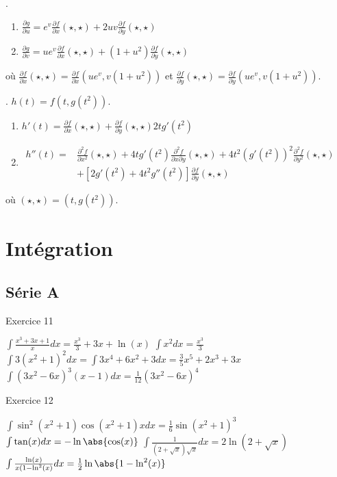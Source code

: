 .
\begin{enumerate}
    \item $\frac{ \partial g }{ \partial u } = e^v\frac{ \partial f }{ \partial x }(\star,\star)+2uv\frac{ \partial f }{ \partial y }(\star,\star)$
    \item $\frac{ \partial g }{ \partial v } = ue^v\frac{ \partial f }{ \partial x }(\star,\star)+(1+u^2)\frac{ \partial f }{ \partial y }(\star,\star)$
\end{enumerate}
o\`{u} $\frac{ \partial f }{ \partial x }(\star,\star) = \frac{ \partial f }{ \partial x }(ue^v,v(1+u^2))$ et $\frac{ \partial f }{ \partial y }(\star,\star) = \frac{ \partial f }{ \partial y }(ue^v,v(1+u^2))$.

. $h(t)=f(t,g(t^2))$.\\

\begin{enumerate}
    \item $h'(t)=\frac{ \partial f }{ \partial x }(\star,\star)+\frac{ \partial f }{ \partial y }(\star,\star)2tg'(t^2)$
    \item $ \begin{array}{rl} h''(t)=     &   \frac{ \partial^2f }{ \partial x^2 }(\star,\star)+4tg'(t^2)\frac{ \partial^2f }{ \partial x\partial y }(\star,\star)+4t^2(g'(t^2))^2\frac{ \partial^2f }{ \partial y^2 }(\star,\star) \\
        & +[2g'(t^2)+4t^2g''(t^2)]\frac{ \partial f }{ \partial y }(\star,\star)\end{array}$

\end{enumerate}
où $(\star,\star) = (t,g(t^2))$.




 \section{Intégration}
 \subsection{Série A}
 Exercice 11
 \begin{enumerate}
   \exr $\int \frac{x^3+3x+1}{x} d x = \frac{x^3}3 + 3x + \ln(x)$%
   \exr $\int x^2d x = \frac{x^3}3$%
   \exr $\int 3(x^2+1)^2 d x = \int 3 x^4 + 6 x^2 + 3 d x = \frac 35
   x^5 + 2 x^3 + 3x$%
   \exr $\int (3x^2 - 6x)^3 (x-1) d x = \frac1{12} (3x^2 - 6x)^4$
 \end{enumerate}

 Exercice 12
 \begin{enumerate}
   \exr $\int \sin^2(x^2+1) \cos(x^2+1) x d x = \frac16
   \sin(x^2+1)^3$%
   \exr $\int \tan(x) d x = -\ln\abs{\cos(x)}$%
   \exr $\int \frac{1}{(2+\sqrt{x})\sqrt x} d x= 2 \ln(2+\sqrt{x})$%
   \exr $\int \frac{\ln(x)}{x(1- \ln^2(x)} d x = \frac12
   \ln\abs{1-\ln^2(x)}$%
 \end{enumerate}



